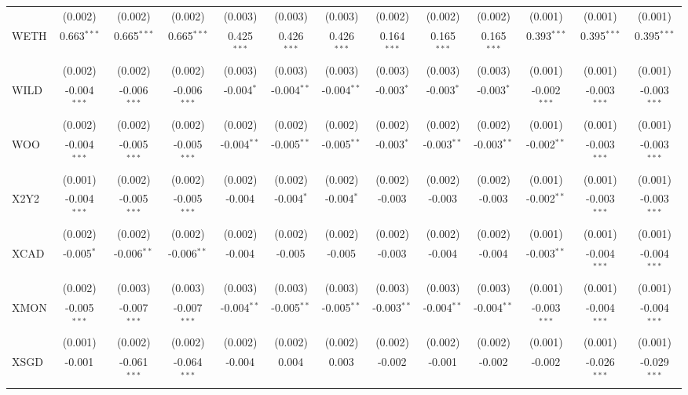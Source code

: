 \begin{table}[!htbp]
\begin{tabular}{@{\extracolsep{5pt}}lcccccccccccc}
  & (0.002) & (0.002) & (0.002) & (0.003) & (0.003) & (0.003) & (0.002) & (0.002) & (0.002) & (0.001) & (0.001) & (0.001) \\
 WETH & 0.663$^{***}$ & 0.665$^{***}$ & 0.665$^{***}$ & 0.425$^{***}$ & 0.426$^{***}$ & 0.426$^{***}$ & 0.164$^{***}$ & 0.165$^{***}$ & 0.165$^{***}$ & 0.393$^{***}$ & 0.395$^{***}$ & 0.395$^{***}$ \\
  & (0.002) & (0.002) & (0.002) & (0.003) & (0.003) & (0.003) & (0.003) & (0.003) & (0.003) & (0.001) & (0.001) & (0.001) \\
 WILD & -0.004$^{***}$ & -0.006$^{***}$ & -0.006$^{***}$ & -0.004$^{*}$ & -0.004$^{**}$ & -0.004$^{**}$ & -0.003$^{*}$ & -0.003$^{*}$ & -0.003$^{*}$ & -0.002$^{***}$ & -0.003$^{***}$ & -0.003$^{***}$ \\
  & (0.002) & (0.002) & (0.002) & (0.002) & (0.002) & (0.002) & (0.002) & (0.002) & (0.002) & (0.001) & (0.001) & (0.001) \\
 WOO & -0.004$^{***}$ & -0.005$^{***}$ & -0.005$^{***}$ & -0.004$^{**}$ & -0.005$^{**}$ & -0.005$^{**}$ & -0.003$^{*}$ & -0.003$^{**}$ & -0.003$^{**}$ & -0.002$^{**}$ & -0.003$^{***}$ & -0.003$^{***}$ \\
  & (0.001) & (0.002) & (0.002) & (0.002) & (0.002) & (0.002) & (0.002) & (0.002) & (0.002) & (0.001) & (0.001) & (0.001) \\
 X2Y2 & -0.004$^{***}$ & -0.005$^{***}$ & -0.005$^{***}$ & -0.004$^{}$ & -0.004$^{*}$ & -0.004$^{*}$ & -0.003$^{}$ & -0.003$^{}$ & -0.003$^{}$ & -0.002$^{**}$ & -0.003$^{***}$ & -0.003$^{***}$ \\
  & (0.002) & (0.002) & (0.002) & (0.002) & (0.002) & (0.002) & (0.002) & (0.002) & (0.002) & (0.001) & (0.001) & (0.001) \\
 XCAD & -0.005$^{*}$ & -0.006$^{**}$ & -0.006$^{**}$ & -0.004$^{}$ & -0.005$^{}$ & -0.005$^{}$ & -0.003$^{}$ & -0.004$^{}$ & -0.004$^{}$ & -0.003$^{**}$ & -0.004$^{***}$ & -0.004$^{***}$ \\
  & (0.002) & (0.003) & (0.003) & (0.003) & (0.003) & (0.003) & (0.003) & (0.003) & (0.003) & (0.001) & (0.001) & (0.001) \\
 XMON & -0.005$^{***}$ & -0.007$^{***}$ & -0.007$^{***}$ & -0.004$^{**}$ & -0.005$^{**}$ & -0.005$^{**}$ & -0.003$^{**}$ & -0.004$^{**}$ & -0.004$^{**}$ & -0.003$^{***}$ & -0.004$^{***}$ & -0.004$^{***}$ \\
  & (0.001) & (0.002) & (0.002) & (0.002) & (0.002) & (0.002) & (0.002) & (0.002) & (0.002) & (0.001) & (0.001) & (0.001) \\
 XSGD & -0.001$^{}$ & -0.061$^{***}$ & -0.064$^{***}$ & -0.004$^{}$ & 0.004$^{}$ & 0.003$^{}$ & -0.002$^{}$ & -0.001$^{}$ & -0.002$^{}$ & -0.002$^{}$ & -0.026$^{***}$ & -0.029$^{***}$ \\

\end{tabular}
\end{table}
